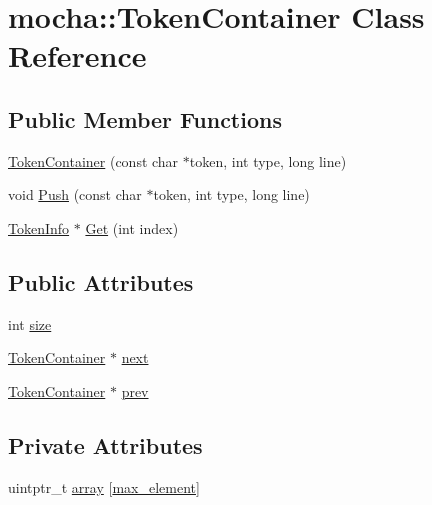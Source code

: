 \hypertarget{classmocha_1_1_token_container}{
\section{mocha::TokenContainer Class Reference}
\label{classmocha_1_1_token_container}
}
\subsection*{Public Member Functions}
\begin{DoxyCompactItemize}
\item 
\hyperlink{classmocha_1_1_token_container_ab487103d44ea960db9995e5a1db9942e}{TokenContainer} (const char $\ast$token, int type, long line)
\item 
void \hyperlink{classmocha_1_1_token_container_ae6f90703f3a99e2497d59e2384fca774}{Push} (const char $\ast$token, int type, long line)
\item 
\hyperlink{classmocha_1_1_token_info}{TokenInfo} $\ast$ \hyperlink{classmocha_1_1_token_container_ae8b54f2e0003acea68bf940d9e9bea05}{Get} (int index)
\end{DoxyCompactItemize}
\subsection*{Public Attributes}
\begin{DoxyCompactItemize}
\item 
int \hyperlink{classmocha_1_1_token_container_a5b6cd648b910921d15a12a01f189f369}{size}
\item 
\hyperlink{classmocha_1_1_token_container}{TokenContainer} $\ast$ \hyperlink{classmocha_1_1_token_container_a9fa1b9acc7664fc1187ad1655b333598}{next}
\item 
\hyperlink{classmocha_1_1_token_container}{TokenContainer} $\ast$ \hyperlink{classmocha_1_1_token_container_a77a2a71f8311b6ab976c926794eaed68}{prev}
\end{DoxyCompactItemize}
\subsection*{Private Attributes}
\begin{DoxyCompactItemize}
\item 
uintptr\_\-t \hyperlink{classmocha_1_1_token_container_af718de0ef6d4228210b26b0d9e279319}{array} \mbox{[}\hyperlink{namespacemocha_a7c62b652d237959c56aa0f587d471292}{max\_\-element}\mbox{]}
\end{DoxyCompactItemize}



